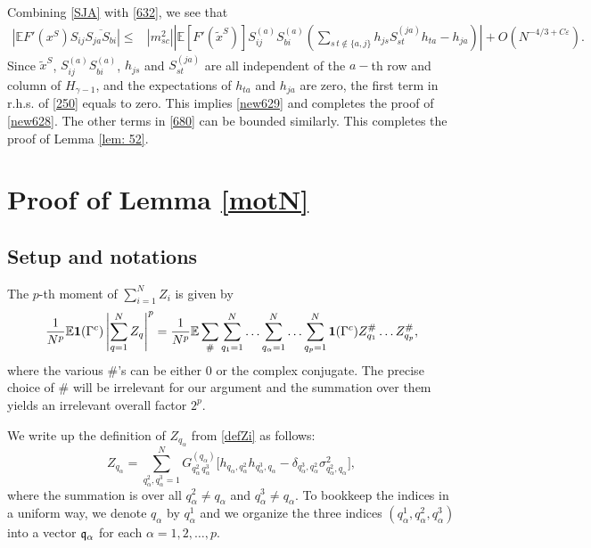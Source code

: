 \documentclass[draft]{article}
\newcommand{\wt}{\widetilde}
\newcommand{\e}{\varepsilon}
\newcommand{\fq}{{\frak q}}
\newcommand{\al}{\alpha}
\newcommand{\be}{\begin{equation}}
\newcommand{\ee}{\end{equation}}
\newcommand{\E}{{\mathbb E }}
\newcommand{\qed}{\hfill\fbox{}\par\vspace{0.3mm}}
\numberwithin{equation}{section}
\numberwithin{theorem}{section}
\numberwithin{definition}{section}
\numberwithin{remark}{section}
\begin{document}
Combining \eqref{SJA} with \eqref{632}, we see that 
\begin{align}\label{250}
|\E F'(x^S)S_{ij}\overline{S_{ja}S_{bi}}|
\leq &
|m_{sc}^2|\left|\E [F'( \wt x^S)] S_{ij}^{(a)}S_{bi}^{(a)}
\left(\sum_{s\,t\notin\{a,j\}}h_{js}S^{(ja)}_{st}h_{ta}-h_{ja}\right)\right|
+O\left(N^{-4/3+C\e}\right).
\end{align}
Since $\wt x^S$, $S_{ij}^{(a)}S_{bi}^{(a)}$, $h_{js}$ and $S^{(ja)}_{st}$
are all
independent of the $a-$th row and column of $H_{\gamma-1}$, 
 and the expectations
 of $h_{ta}$ and $h_{ja}$ are zero, the first term in r.h.s. of \eqref{250} equals 
to zero. This implies  \eqref{new629} and completes the proof of  \eqref{new628}. 
The other terms in \eqref{680} can be bounded similarly. 
This completes the proof of Lemma \ref{lem: 52}.
\qed  










\section{Proof of Lemma \ref{motN}}\label{sec:Z}



\subsection{Setup and notations}

The $p$-th moment  of $\sum_{i=1}^NZ_i$ is given by  
 \be\label{21p}
 \frac{1}{N^p} \E  {\bf 1} (\Gamma^c) \left|\sum_{q=1}^N Z_q \right|^p
= \frac{1}{N^p} \E\sum_\# \sum_{q_1=1}^N \ldots\sum_{q_\al=1}^N \ldots\sum_{q_p = 1}^N
  {\bf 1} (\Gamma^c)
Z_{q_1}^\#  \ldots Z_{q_p}^\# ,
 \ee 
 where the various $\#$'s can be either $0$ or the complex conjugate.
The precise choice of $\#$ will be irrelevant for our argument
and the summation over them yields an irrelevant overall factor $2^p$.


We write up the definition of $Z_{q_\al}$  from \eqref{defZi}
as follows:
\be\label{34}
    Z_{q_\al} = \sum_{q_\al^2, q_\al^3=1}^N   G^{(q_\alpha)}_{q_\alpha^2 \,q_\alpha^3}
     \big[ h_{q_\al, q^2_\al}
  h_{q_\alpha^3, q_\alpha} -\delta_{q^3_\alpha,  q^2_\alpha}
  \sigma^2_{q^2_\alpha, q_\alpha}\big],
\ee
where the summation is over all $q_\al^2\ne q_\al$ and $q_\al^3\ne q_\al$.
To bookkeep the indices in a uniform way, we denote $q_\al$ by $q_\al^1$
and we organize the three indices $(q^1_\al, q^2_\al, q^3_\al)$
into a vector  $\fq_\alpha$ for each $\al =1,2,\ldots, p$.
\end{document}
